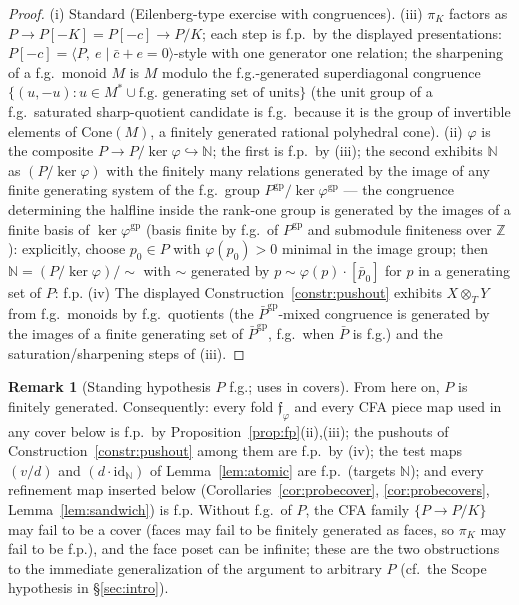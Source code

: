 \documentclass[11pt]{article}
\theoremstyle{definition}
\newtheorem{remark}[theorem]{Remark}
\newcommand{\gp}{\mathrm{gp}}
\newcommand{\Cone}{\mathrm{Cone}}
\begin{document}
\begin{proof}
(i) Standard (Eilenberg-type exercise with congruences).
(iii) $\pi_K$ factors as $P\to P[-K]=P[-c]\to P/K$; each step is
f.p.\ by the displayed presentations: $P[-c]=\langle P,\ e
\mid \bar c+e=0\rangle$-style with one generator one relation;
the sharpening of a f.g.\ monoid $M$ is $M$ modulo the
f.g.-generated superdiagonal congruence $\{(u,-u):u\in
M^*\cup\text{f.g.\ generating set of units}\}$ (the unit group of
a f.g.\ saturated sharp-quotient candidate is f.g.\ because it
is the group of invertible elements of $\Cone(M)$, a finitely
generated rational polyhedral cone).
(ii) $\varphi$ is the composite $P\to P/\ker\varphi
\hookrightarrow\mathbb N$; the first is f.p.\ by (iii); the
second exhibits $\mathbb N$ as $(P/\ker\varphi)$ with the
finitely many relations generated by the image of any finite
generating system of the f.g.\ group $P^{\gp}/\ker\varphi^{\gp}$
--- the congruence determining the halfline inside the rank-one
group is generated by the images of a finite basis of
$\ker\varphi^{\gp}$ (basis finite by f.g.\ of $P^{\gp}$ and
submodule finiteness over $\mathbb Z$): explicitly, choose
$p_0\in P$ with $\varphi(p_0)>0$ minimal in the image group;
then $\mathbb N=(P/\ker\varphi)/\!\sim$ with $\sim$ generated by
$p\sim\varphi(p)\cdot[\bar p_0]$ for $p$ in a generating set of
$P$: f.p.
(iv) The displayed Construction~\ref{constr:pushout} exhibits
$X\otimes_TY$ from f.g.\ monoids by f.g.\ quotients (the
$\bar P^{\gp}$-mixed congruence is generated by the images of a
finite generating set of $\bar P^{\gp}$, f.g.\ when $\bar P$ is
f.g.) and the saturation/sharpening steps of (iii).
\end{proof}

\begin{remark}[Standing hypothesis $P$ f.g.; uses in covers]
\label{rem:nonfg}
From here on, $P$ is finitely generated. Consequently: every
fold $\mathfrak f_\varphi$ and every CFA piece map used in any
cover below is f.p.\ by Proposition~\ref{prop:fp}(ii),(iii); the
pushouts of Construction~\ref{constr:pushout} among them are
f.p.\ by (iv); the test maps $(v/d)$ and
$(d\cdot\mathrm{id}_{\mathbb N})$ of Lemma~\ref{lem:atomic} are
f.p.\ (targets $\mathbb N$); and every refinement map inserted
below (Corollaries~\ref{cor:probecover}, \ref{cor:probecovers},
Lemma~\ref{lem:sandwich}) is f.p. Without f.g.\ of $P$, the CFA
family $\{P\to P/K\}$ may fail to be a cover (faces may fail to
be finitely generated as faces, so $\pi_K$ may fail to be
f.p.), and the face poset can be infinite; these are the two
obstructions to the immediate generalization of the argument to
arbitrary $P$ \textup{(}cf.\ the Scope hypothesis in
\S\ref{sec:intro}\textup{)}.
\end{remark}
\end{document}
